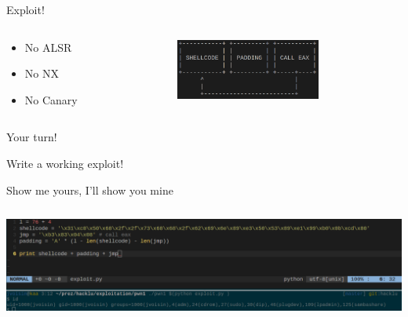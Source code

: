 \documentclass[10pt, compress]{beamer}
\begin{document}
\begin{frame}{Exploit!}
	\begin{columns}
		\begin{column}{.3\textwidth}
			\begin{itemize}
				\item No ALSR
				\item No NX
				\item No Canary
			\end{itemize}
		\end{column}
		\begin{column}{.7\textwidth}
			\includegraphics[width=\textwidth,height=2cm]{pwn1_shellcode.png}
		\end{column}
	\end{columns}
\end{frame}


\begin{frame}{Your turn!}
	\begin{center}
		Write a working exploit!
	\end{center}
\end{frame}

\begin{frame}{Show me yours, I'll show you mine}
	\includegraphics[width=1.05\textwidth,height=4.5cm]{exploit_pwn1.png}
\end{frame}
\end{document}
